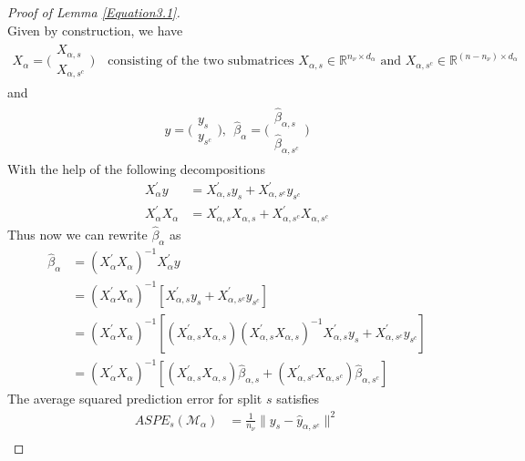 \documentclass[Research_Module_ES.tex]{subfiles}
\begin{document}
\begin{proof}[Proof of Lemma \ref{Equation3.1}]~\\
	Given by construction, we have
	\begin{align*}
	X_\alpha=\Big(\begin{matrix}
	X_{\alpha,s}\\ X_{\alpha,s^c}
	\end{matrix}\Big)
	\text{~~~consisting of the two submatrices~} X_{\alpha,s}\in\mathbb{R}^{n_\nu\times d_\alpha} \text{~and~} X_{\alpha,s^c}\in\mathbb{R}^{(n-n_\nu)\times d_\alpha}
	\end{align*}
	and 
	\begin{align*}
	y=\Big(\begin{matrix}
	y_{s}\\ y_{s^c}
	\end{matrix}\Big),~~\hat{\beta}_\alpha=\Big(\begin{matrix}
	\hat{\beta}_{\alpha,s}\\ \hat{\beta}_{\alpha,s^c}
	\end{matrix}\Big)
	\end{align*}
	With the help of the following decompositions
	\begin{align*}
	X_\alpha^\prime y&=X_{\alpha,s}^\prime y_s+X_{\alpha,s^c}^\prime y_{s^c}\\
	X_\alpha^\prime X_\alpha&=X_{\alpha,s}^\prime X_{\alpha,s}+X_{\alpha,s^c}^\prime X_{\alpha,s^c}
	\end{align*}
	Thus now we can rewrite $\hat{\beta}_\alpha$ as
	\begin{align}
	\hat{\beta}_\alpha&=(X_\alpha^\prime X_\alpha)^{-1}X_\alpha^\prime y   \nonumber\\
	&=(X_\alpha^\prime X_\alpha)^{-1}[X_{\alpha,s}^\prime y_s+X_{\alpha,s^c}^\prime y_{s^c}]  \nonumber \\
	&=(X_\alpha^\prime X_\alpha)^{-1}[(X_{\alpha,s}^\prime X_{\alpha,s})(X_{\alpha,s}^\prime X_{\alpha,s})^{-1}X_{\alpha,s}^\prime y_s+X_{\alpha,s^c}^\prime y_{s^c}]  \nonumber \\
	&=(X_\alpha^\prime X_\alpha)^{-1}[(X_{\alpha,s}^\prime X_{\alpha,s}) \hat{\beta}_{\alpha,s}+(X_{\alpha,s^c}^\prime X_{\alpha,s^c})\hat{\beta}_{\alpha,s^c}]
	\label{beta_alpha_hat_decomposition}
	\end{align}
	The average squared prediction error for split $s$ satisfies
	\begin{align*}
	ASPE_{s}(\mathcal{M}_\alpha)&=\frac{1}{n_\nu}\parallel y_s-\hat{y}_{\alpha,s^c}\parallel^2\\

\end{align*}
\end{proof}
\end{document}
